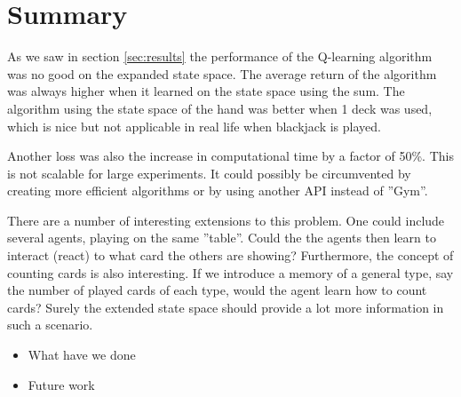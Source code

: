 \section{Summary}

As we saw in section \ref{sec:results} the performance of the Q-learning algorithm was no good on the expanded state space. The average return of the algorithm was always higher when it learned on the state space using the sum. The algorithm using the state space of the hand was better when 1 deck was used, which is nice but not applicable in real life when blackjack is played. 

Another loss was also the increase in computational time by a factor of 50\%. This is not scalable for large experiments. It could possibly be circumvented by creating more efficient algorithms or by using another API instead of ''Gym''.  

There are a number of interesting extensions to this problem. One could include several agents, playing on the same ''table''. Could the the agents then learn to interact (react) to what card the others are showing? Furthermore, the concept of counting cards is also interesting. If we introduce a memory of a general type, say the number of played cards of each type, would the agent learn how to count cards? Surely the extended state space should provide a lot more information in such a scenario. 

\begin{itemize}
 \item What have we done
 \item Future work
\end{itemize}